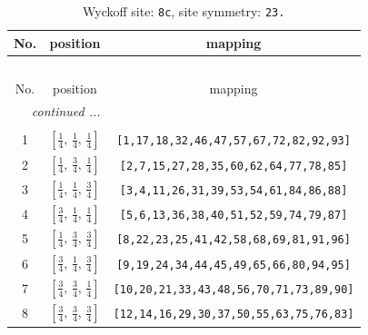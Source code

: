\documentclass[fleqn,8pt]{jsarticle}
\begin{document}
\begin{longtable}{ccc}
\caption{Wyckoff site: {\tt 8c}, site symmetry: {\tt 23.}}
 \\
 \hline \hline
No. & position & mapping \\ \hline \endfirsthead

\multicolumn{2}{l}{\tablename\ \thetable{}} \\
 \hline \hline
No. & position & mapping \\ \hline \endhead

 \hline \hline
\multicolumn{2}{r}{\footnotesize\it continued ...} \\ \endfoot

 \hline \hline
\multicolumn{2}{r}{} \\ \endlastfoot

1 & $\left[ \frac{1}{4},\, \frac{1}{4},\, \frac{1}{4} \right]$ & {\tt [1,17,18,32,46,47,57,67,72,82,92,93]} \\ \hline
2 & $\left[ \frac{1}{4},\, \frac{3}{4},\, \frac{1}{4} \right]$ & {\tt [2,7,15,27,28,35,60,62,64,77,78,85]} \\ \hline
3 & $\left[ \frac{1}{4},\, \frac{1}{4},\, \frac{3}{4} \right]$ & {\tt [3,4,11,26,31,39,53,54,61,84,86,88]} \\ \hline
4 & $\left[ \frac{3}{4},\, \frac{1}{4},\, \frac{1}{4} \right]$ & {\tt [5,6,13,36,38,40,51,52,59,74,79,87]} \\ \hline
5 & $\left[ \frac{1}{4},\, \frac{3}{4},\, \frac{3}{4} \right]$ & {\tt [8,22,23,25,41,42,58,68,69,81,91,96]} \\ \hline
6 & $\left[ \frac{3}{4},\, \frac{1}{4},\, \frac{3}{4} \right]$ & {\tt [9,19,24,34,44,45,49,65,66,80,94,95]} \\ \hline
7 & $\left[ \frac{3}{4},\, \frac{3}{4},\, \frac{1}{4} \right]$ & {\tt [10,20,21,33,43,48,56,70,71,73,89,90]} \\ \hline
8 & $\left[ \frac{3}{4},\, \frac{3}{4},\, \frac{3}{4} \right]$ & {\tt [12,14,16,29,30,37,50,55,63,75,76,83]} \\
\end{longtable}
\renewcommand{\arraystretch}{1.2}
\end{document}
